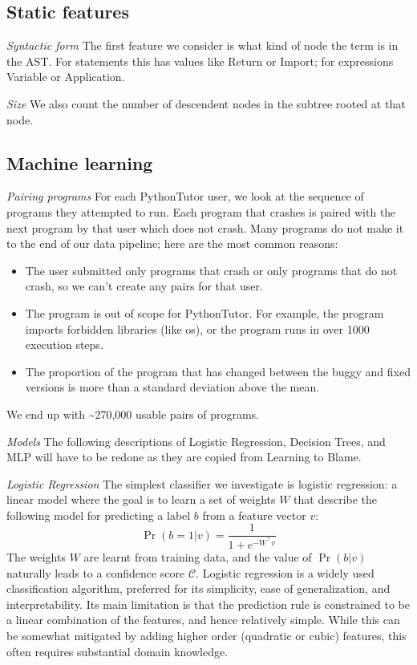 \documentclass[conference]{IEEEtran}
\begin{document}
\subsection{Static features}

\emph{Syntactic form} The first feature we consider is what kind of node the term
is in the AST. For statements this has values like Return or Import; for expressions
Variable or Application.

\emph{Size} We also count the number of descendent nodes in the subtree rooted at that node.

\subsection{Machine learning}

\emph{Pairing programs} For each PythonTutor user, we look at the sequence of
programs they attempted to run. Each program that crashes is paired with the next
program by that user which does not crash. Many programs do not make it to the
end of our data pipeline; here are the most common reasons:
\begin{itemize}
    \item The user submitted only programs that crash or only programs that do
    not crash, so we can't create any pairs for that user.
    \item The program is out of scope for PythonTutor. For
    example, the program imports forbidden libraries (like os), or the program
    runs in over 1000 execution steps.
    \item The proportion of the program that has changed between the buggy and
    fixed versions is more than a standard deviation above the mean.
\end{itemize}
We end up with \textasciitilde270,000 usable pairs of programs.

\emph{Models} The following descriptions of Logistic Regression, Decision Trees,
and MLP will have to be redone as they are copied from Learning to Blame.

\emph{Logistic Regression}
The simplest classifier we investigate is logistic regression:
a linear model where the goal is to learn a set of weights $W$
that describe the following model for predicting a label
$b$ from a feature vector $v$:
%
\[ \Pr(b = 1 | v) = \frac{1}{1 + e^{-W^{\top} v}} \]
%
The weights $W$ are learnt from training data, and the value of
$\Pr(b | v)$ naturally leads to a confidence score $\mathcal{C}$.
%
Logistic regression is a widely used classification algorithm, preferred
for its simplicity, ease of generalization, and interpretability.
%
Its main limitation is that the prediction rule is constrained to be a
linear combination of the features, and hence relatively simple.
%
While this can be somewhat mitigated by adding higher order (quadratic
or cubic) features, this often requires substantial domain knowledge.
\end{document}
